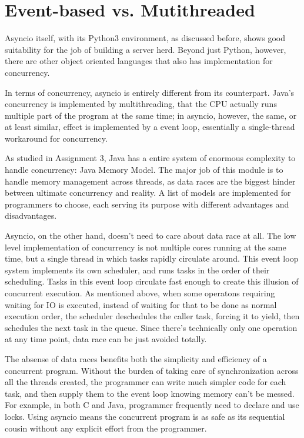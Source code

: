 \documentclass[letterpaper,twocolumn,10pt]{article}
\begin{document}
\section{Event-based vs. Mutithreaded}

Asyncio itself, with its Python3 environment, as discussed before, shows good suitability for the job of building a server herd.
Beyond just Python, however, there are other object oriented languages that also has implementation for concurrency.

In terms of concurrency, asyncio is entirely different from its counterpart.
Java's concurrency is implemented by multithreading, that the CPU actually runs multiple part of the program at the same time;
in asyncio, however, the same, or at least similar, effect is implemented by a event loop, essentially a single-thread workaround for concurrency.

As studied in Assignment 3, Java has a entire system of enormous complexity to handle concurrency: Java Memory Model. 
The major job of this module is to handle memory management across threads, as data races are the biggest hinder between ultimate concurrency and reality. 
A list of models are implemented for programmers to choose, each serving its purpose with different advantages and disadvantages.

Asyncio, on the other hand, doesn't need to care about data race at all.
The low level implementation of concurrency is not multiple cores running at the same time, but a single thread in which tasks rapidly circulate around.
This event loop system implements its own scheduler, and runs tasks in the order of their scheduling.
Tasks in this event loop circulate fast enough to create this illusion of concurrent execution.
As mentioned above, when some operatons requiring waiting for IO is executed, instead of waiting for that to be done as normal execution order, the scheduler deschedules the caller task, forcing it to yield, then schedules the next task in the queue.
Since there's technically only one operation at any time point, data race can be just avoided totally.

The absense of data races benefits both the simplicity and efficiency of a concurrent program.
Without the burden of taking care of synchronization across all the threads created, the programmer can write much simpler code for each task, and then supply them to the event loop knowing memory can't be messed. 
For example, in both C and Java, programmer frequently need to declare and use locks.
Using asyncio means the concurrent program is as safe as its sequential cousin without any explicit effort from the programmer.
\end{document}
